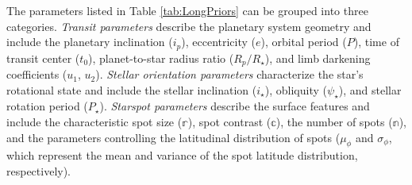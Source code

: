 \documentclass[twocolumn]{aastex631}
\newcommand{\sabinasays}[1]{{\color{purple}#1}}
\begin{document}
\sabinasays{The parameters listed in Table \ref{tab:LongPriors} can be grouped into three categories. 
\textit{Transit parameters} describe the planetary system geometry and include the planetary inclination ($i_p$), 
eccentricity ($e$), orbital period ($P$), time of transit center ($t_0$), planet-to-star radius ratio ($R_p/R_\star$), and 
limb darkening coefficients ($u_1$, $u_2$). \textit{Stellar orientation parameters} characterize the star's rotational state and 
include the stellar inclination ($i_\star$), obliquity ($\psi_\star$), and stellar rotation period ($P_\star$). \textit{Starspot parameters} 
describe the surface features and include the characteristic spot size ($\mathbb{r}$), spot contrast ($\mathbb{c}$), the number of spots 
($\mathbb{n}$), and the parameters controlling the latitudinal distribution of spots ($\mu_\phi$ and $\sigma_\phi$, which represent 
the mean and variance of the spot latitude distribution, respectively).}
\end{document}
